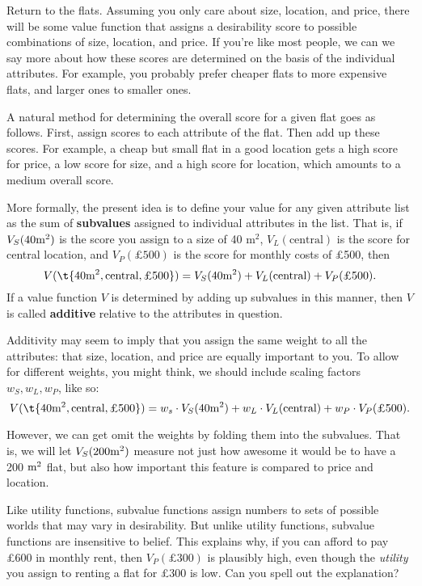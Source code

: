 Return to the flats. Assuming you only care about size, location, and
price, there will be some value function that assigns a desirability
score to possible combinations of size, location, and price. If you're
like most people, we can we say more about how these scores are
determined on the basis of the individual attributes. For example, you
probably prefer cheaper flats to more expensive flats, and larger ones
to smaller ones.

A natural method for determining the overall score for a given flat
goes as follows. First, assign scores to each attribute of the flat.
Then add up these scores. For example, a cheap but small flat in a
good location gets a high score for price, a low score for size, and a
high score for location, which amounts to a medium overall score.

More formally, the present idea is to define your value for any given
attribute list as the sum of \textbf{subvalues} assigned to individual
attributes in the list. That is, if $V_{S}(40 \text{m}^2)$ is the score you
assign to a size of 40 m$^2$, $V_{L}(\text{central})$ is the score for
central location, and $V_{P}(\text{£500})$ is the score for monthly
costs of £500, then
\[
V(\t{40 \m^2, \text{central}, \text{£500}}) = V_{S}(40 \m^2) +
V_{L}(\text{central}) + V_{P}(\text{£500}).
\]
%
If a value function $V$ is determined by adding up subvalues
in this manner, then $V$ is called \textbf{additive} relative to the
attributes in question.

Additivity may seem to imply that you assign the same weight to
all the attributes: that size, location, and price are equally
important to you. To allow for different weights, you might think, we
should include scaling factors $w_S, w_L, w_P$, like so:
\[
V(\t{40 \m^2, \text{central}, \text{£500}}) = w_s \cdot V_{S}(40 \m^2) +
w_L \cdot V_{L}(\text{central}) + w_P \cdot V_{P}(\text{£500}).
\]

However, we can get omit the weights by folding them into the
subvalues. That is, we will let $V_S(200 \text{m}^2)$ measure not just how
awesome it would be to have a 200 $\text{m}^2$ flat, but also how important
this feature is compared to price and location.


\begin{exercise1}\label{e:subv-not-u}
  Like utility functions, subvalue functions assign numbers to sets of
  possible worlds that may vary in desirability. But unlike utility
  functions, subvalue functions are insensitive to belief. This
  explains why, if you can afford to pay £600 in monthly
  rent, then $V_{P}(\text{£300})$ is plausibly high, even though the
  \emph{utility} you assign to renting a flat for £300 is low. Can you
  spell out the explanation?
\end{exercise1}

